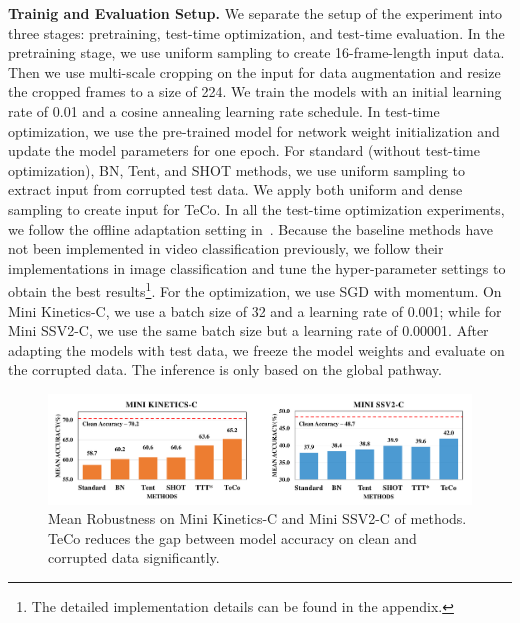 \documentclass{article} %
\begin{document}
\textbf{Trainig and Evaluation Setup.} We separate the setup of the experiment into three stages: pretraining, test-time optimization, and test-time evaluation. 
In the pretraining stage, we use uniform sampling to create 16-frame-length input data. 
Then we use multi-scale cropping on the input for data augmentation and resize the cropped frames to a size of 224. 
We train the models with an initial learning rate of 0.01 and a cosine annealing learning rate schedule. 
In test-time optimization, we use the pre-trained model for network weight initialization and update the model parameters for one epoch. 
For standard (without test-time optimization), BN, Tent, and SHOT methods, we use uniform sampling to extract input from corrupted test data. 
We apply both uniform and dense sampling to create input for TeCo. 
In all the test-time optimization experiments, we follow the offline adaptation setting in~\cite{wang2020tent}. Because the baseline methods have not been implemented in video classification previously, we follow their implementations in image classification and tune the hyper-parameter settings to obtain the best results\footnote{The detailed implementation details can be found in the appendix.}. 
For the optimization, we use SGD with momentum. On Mini Kinetics-C, we use a batch size of 32 and a learning rate of 0.001; while for Mini SSV2-C, we use the same batch size but a learning rate of 0.00001. 
After adapting the models with test data, we freeze the model weights and evaluate on the corrupted data. 
The inference is only based on the global pathway. 

\begin{figure}[t]
\begin{center}
        \includegraphics[width=0.9\linewidth]{./images/mean_mpc-v2.pdf}
\end{center}
\caption{Mean Robustness on Mini Kinetics-C and Mini SSV2-C of methods. TeCo reduces the gap between model accuracy on clean and corrupted data significantly.}
\vspace{-0.5cm}
\label{mean-robustness-fig}
\end{figure}
\end{document}
